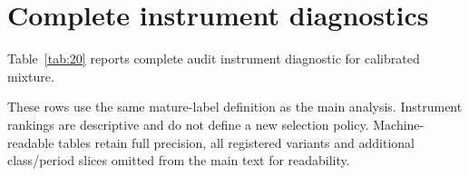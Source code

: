 \section{Complete instrument diagnostics}\label{sec:appendix-a}

\noindent Table~\ref{tab:20} reports complete audit instrument diagnostic for calibrated mixture.



These rows use the same mature-label definition as the main analysis. Instrument rankings are descriptive and do not define a new selection policy. Machine-readable tables retain full precision, all registered variants and additional class/period slices omitted from the main text for readability.
